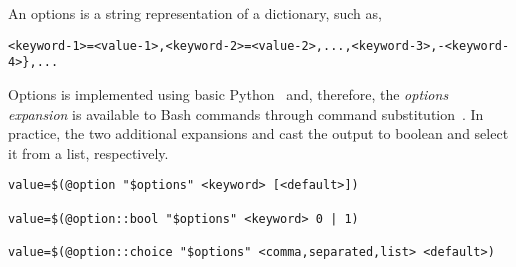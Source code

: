 
An options is a string representation of a dictionary, such as,
%
\begin{verbatim}
<keyword-1>=<value-1>,<keyword-2>=<value-2>,...,<keyword-3>,-<keyword-4>},...
\end{verbatim}
%
Options is implemented using basic Python~ and, therefore, the \emph{options expansion} is available to Bash commands through command substitution~\cite{command_substitution}. In practice, the two additional expansions  and  cast the output to boolean and select it from a list, respectively.
%
\begin{verbatim}
value=$(@option "$options" <keyword> [<default>])

value=$(@option::bool "$options" <keyword> 0 | 1)

value=$(@option::choice "$options" <comma,separated,list> <default>)
\end{verbatim}
